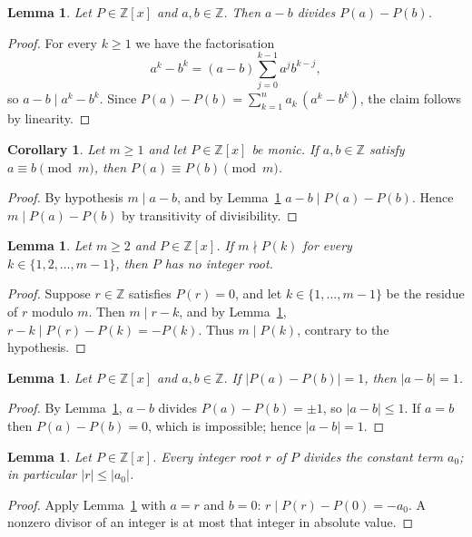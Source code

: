 \documentclass[11pt]{amsart}
\newtheorem{lemma}[theorem]{Lemma}
\newtheorem{corollary}[theorem]{Corollary}
\theoremstyle{definition}
\newcommand{\Z}{\mathbb{Z}}
\begin{document}
\begin{lemma}\label{lem:diff}
Let $P\in\Z[x]$ and $a,b\in\Z$. Then $a-b$ divides $P(a)-P(b)$.
\end{lemma}

\begin{proof}
For every $k\geq 1$ we have the factorisation
\[
a^k-b^k=(a-b)\sum_{j=0}^{k-1}a^{j}b^{k-j},
\]
so $a-b \mid a^k-b^k$. Since
$P(a)-P(b)=\sum_{k=1}^{n}a_k\,(a^k-b^k)$, the claim follows by linearity.
\end{proof}

\begin{corollary}\label{cor:cong}
Let $m\geq 1$ and let $P\in\Z[x]$ be monic. If $a,b\in\Z$ satisfy
$a\equiv b \pmod m$, then $P(a)\equiv P(b)\pmod m$.
\end{corollary}

\begin{proof}
By hypothesis $m\mid a-b$, and by Lemma~\ref{lem:diff} $a-b\mid P(a)-P(b)$.
Hence $m\mid P(a)-P(b)$ by transitivity of divisibility.
\end{proof}

\begin{lemma}\label{lem:noroot}
Let $m\geq 2$ and $P\in\Z[x]$. If $m\nmid P(k)$ for every
$k\in\{1,2,\dots,m-1\}$, then $P$ has no integer root.
\end{lemma}

\begin{proof}
Suppose $r\in\Z$ satisfies $P(r)=0$, and let $k\in\{1,\dots,m-1\}$ be the
residue of $r$ modulo $m$. Then $m\mid r-k$, and by Lemma~\ref{lem:diff},
$r-k \mid P(r)-P(k)=-P(k)$. Thus $m\mid P(k)$, contrary to the hypothesis.
\end{proof}

\begin{lemma}\label{lem:unit}
Let $P\in\Z[x]$ and $a,b\in\Z$. If $|P(a)-P(b)|=1$, then $|a-b|=1$.
\end{lemma}

\begin{proof}
By Lemma~\ref{lem:diff}, $a-b$ divides $P(a)-P(b)=\pm 1$, so
$|a-b|\leq 1$. If $a=b$ then $P(a)-P(b)=0$, which is impossible; hence
$|a-b|=1$.
\end{proof}

\begin{lemma}\label{lem:introot}
Let $P\in\Z[x]$. Every integer root $r$ of $P$ divides the constant term
$a_0$; in particular $|r|\leq |a_0|$.
\end{lemma}

\begin{proof}
Apply Lemma~\ref{lem:diff} with $a=r$ and $b=0$: $r\mid P(r)-P(0)=-a_0$.
A nonzero divisor of an integer is at most that integer in absolute value.
\end{proof}
\end{document}
